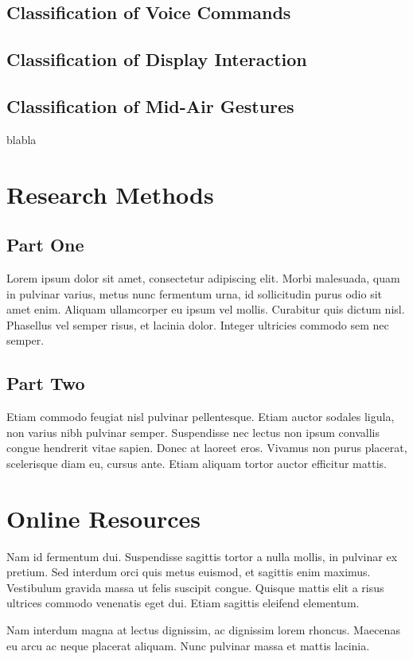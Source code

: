 \documentclass[sigchi]{acmart}
\begin{document}
\subsection{Classification of Voice Commands}

\subsection{Classification of Display Interaction}

\subsection{Classification of Mid-Air Gestures}
blabla








\appendix

\section{Research Methods}

\subsection{Part One}

Lorem ipsum dolor sit amet, consectetur adipiscing elit. Morbi
malesuada, quam in pulvinar varius, metus nunc fermentum urna, id
sollicitudin purus odio sit amet enim. Aliquam ullamcorper eu ipsum
vel mollis. Curabitur quis dictum nisl. Phasellus vel semper risus, et
lacinia dolor. Integer ultricies commodo sem nec semper.

\subsection{Part Two}

Etiam commodo feugiat nisl pulvinar pellentesque. Etiam auctor sodales
ligula, non varius nibh pulvinar semper. Suspendisse nec lectus non
ipsum convallis congue hendrerit vitae sapien. Donec at laoreet
eros. Vivamus non purus placerat, scelerisque diam eu, cursus
ante. Etiam aliquam tortor auctor efficitur mattis.

\section{Online Resources}

Nam id fermentum dui. Suspendisse sagittis tortor a nulla mollis, in
pulvinar ex pretium. Sed interdum orci quis metus euismod, et sagittis
enim maximus. Vestibulum gravida massa ut felis suscipit
congue. Quisque mattis elit a risus ultrices commodo venenatis eget
dui. Etiam sagittis eleifend elementum.

Nam interdum magna at lectus dignissim, ac dignissim lorem
rhoncus. Maecenas eu arcu ac neque placerat aliquam. Nunc pulvinar
massa et mattis lacinia.
\end{document}
